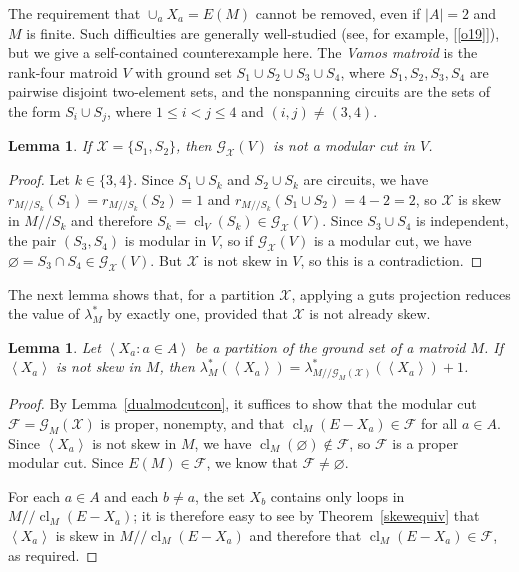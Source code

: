 \documentclass{amsart}
\theoremstyle{plain}
\newtheorem{lemma}[theorem]{Lemma}
\theoremstyle{definition}
\newcommand{\cF}{\mathcal{F}}
\newcommand{\cX}{\mathcal{X}}
\newcommand{\dcon}{/ \!\! /}
\DeclareMathOperator{\cl}{cl}
\newcommand{\ab}[1]{\left\langle#1\right\rangle}
\newcommand{\es}{\varnothing}
\renewcommand{\le}{\leqslant}
\newcommand{\gutscut}[2]{{\mathcal{G}}_{#2}(#1)}
\begin{document}
The requirement that $\cup_a X_a = E(M)$ cannot be removed, even if $|A| = 2$ and $M$ is finite. 
Such difficulties are generally well-studied (see, for example, [\ref{o19}]), 
but we give a self-contained counterexample here. 
The \emph{Vamos matroid} is the rank-four matroid $V$ with ground set 
$S_1 \cup S_2 \cup S_3 \cup S_4$,
where $S_1,S_2,S_3,S_4$ are pairwise disjoint two-element sets, and the nonspanning circuits 
are the sets of the form $S_i \cup S_j$, where $1 \le i < j \le 4$ and $(i,j) \ne (3,4)$. 
\begin{lemma}
  If $\cX = \{S_1,S_2\}$, then $\gutscut{V}{\cX}$ is not a modular cut in $V$. 
\end{lemma}
\begin{proof}
  Let $k \in \{3,4\}$. 
  Since $S_1 \cup S_k$ and $S_2 \cup S_k$ are circuits, we have $r_{M \dcon S_k}(S_1) = r_{M \dcon S_k}(S_2) = 1$ 
  and $r_{M \dcon S_k}(S_1 \cup S_2) = 4 - 2 = 2$, so $\cX$ is skew in $M \dcon S_k$ and therefore 
  $S_k = \cl_V(S_k) \in \gutscut{V}{\cX}$. 
  Since $S_3 \cup S_4$ is independent, the pair $(S_3,S_4)$ is modular in $V$, so if $\gutscut{V}{\cX}$ is a modular cut, 
  we have $\es = S_3 \cap S_4 \in \gutscut{V}{\cX}$. But $\cX$ is not skew in $V$, so this is a contradiction. 
\end{proof}


The next lemma shows that, for a partition $\cX$, applying a guts projection 
reduces the value of $\lambda^*_M$ by exactly one, provided that $\cX$ is not already skew. 

\begin{lemma}\label{gpsub}
  Let $\ab{X_a : a \in A}$ be a partition of the ground set of a matroid $M$.
  If $\ab{X_a}$ is not skew in $M$, then 
  $\lambda_{M}^*(\ab{X_a}) = \lambda_{M \dcon \gutscut{\cX}{M}}^*(\ab{X_a}) + 1$. 
\end{lemma}
\begin{proof}
  By Lemma~\ref{dualmodcutcon}, it suffices to show that the modular cut $\cF = \gutscut{\cX}{M}$ is proper,
  nonempty, and that $\cl_M(E - X_a) \in \cF$ for all $a \in A$.
  Since $\ab{X_a}$ is not skew in $M$, we have $\cl_M(\es) \notin \cF$, 
  so $\cF$ is a proper modular cut. Since $E(M) \in \cF$, 
  we know that $\cF \ne \es$.

  For each $a \in A$ and each $b \ne a$, the set $X_b$ contains only loops in 
  $M \dcon \cl_M(E - X_a)$; it is therefore easy to see by Theorem~\ref{skewequiv}
  that $\ab{X_a}$ is skew in $M \dcon \cl_M(E-X_a)$ and therefore that 
  $\cl_M(E-X_a) \in \cF$, as required. 
\end{proof}
\end{document}
